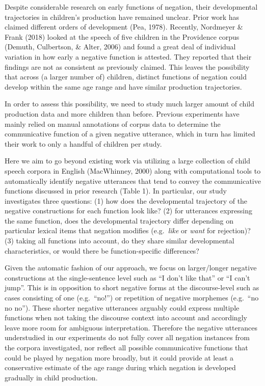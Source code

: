 \documentclass[10pt, letterpaper]{article}
\begin{document}
Despite considerable research on early functions of negation, their
developmental trajectories in children's production have remained
unclear. Prior work has claimed different orders of development (Pea,
1978). Recently, Nordmeyer \& Frank (2018) looked at the speech of five
children in the Providence corpus (Demuth, Culbertson, \& Alter, 2006)
and found a great deal of individual variation in how early a negative
function is attested. They reported that their findings are not as
consistent as previously claimed. This leaves the possibility that
across (a larger number of) children, distinct functions of negation
could develop within the same age range and have similar production
trajectories.

In order to assess this possibility, we need to study much larger amount
of child production data and more children than before. Previous
experiments have mainly relied on manual annotations of corpus data to
determine the communicative function of a given negative utterance,
which in turn has limited their work to only a handful of children per
study.

Here we aim to go beyond existing work via utilizing a large collection
of child speech corpora in English (MacWhinney, 2000) along with
computational tools to automatically identify negative utterances that
tend to convey the communicative functions discussed in prior research
(Table 1). In particular, our study investigates three questions: (1)
how does the developmental trajectory of the negative constructions for
each function look like? (2) for utterances expressing the same
function, does the developmental trajectory differ depending on
particular lexical items that negation modifies (e.g.~\emph{like} or
\emph{want} for rejection)? (3) taking all functions into account, do
they share similar developmental characteristics, or would there be
function-specific differences?

Given the automatic fashion of our approach, we focus on larger/longer
negative constructions at the single-sentence level such as ``I don't
like that'' or ``I can't jump''. This is in opposition to short negative
forms at the discourse-level such as cases consisting of one
(e.g.~``no!'') or repetition of negative morphemes (e.g.~``no no no'').
These shorter negative utterances arguably could express multiple
functions when not taking the discourse context into account and
accordingly leave more room for ambiguous interpretation. Therefore the
negative utterances understudied in our experiments do not fully cover
all negation instances from the corpora investigated, nor reflect all
possible communicative functions that could be played by negation more
broadly, but it could provide at least a conservative estimate of the
age range during which negation is developed gradually in child
production.
\end{document}
